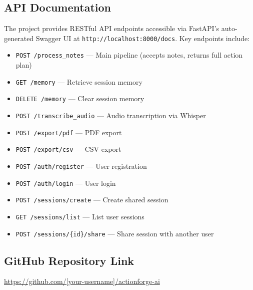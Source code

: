 \documentclass[12pt,a4paper]{article}
\begin{document}
\subsection{API Documentation}
The project provides RESTful API endpoints accessible via FastAPI's auto-generated Swagger UI at \texttt{http://localhost:8000/docs}. Key endpoints include:
\begin{itemize}
  \item \texttt{POST /process\_notes} --- Main pipeline (accepts notes, returns full action plan)
  \item \texttt{GET /memory} --- Retrieve session memory
  \item \texttt{DELETE /memory} --- Clear session memory
  \item \texttt{POST /transcribe\_audio} --- Audio transcription via Whisper
  \item \texttt{POST /export/pdf} --- PDF export
  \item \texttt{POST /export/csv} --- CSV export
  \item \texttt{POST /auth/register} --- User registration
  \item \texttt{POST /auth/login} --- User login
  \item \texttt{POST /sessions/create} --- Create shared session
  \item \texttt{GET /sessions/list} --- List user sessions
  \item \texttt{POST /sessions/\{id\}/share} --- Share session with another user
\end{itemize}

\subsection{GitHub Repository Link}
\url{https://github.com/[your-username]/actionforge-ai}
\end{document}
